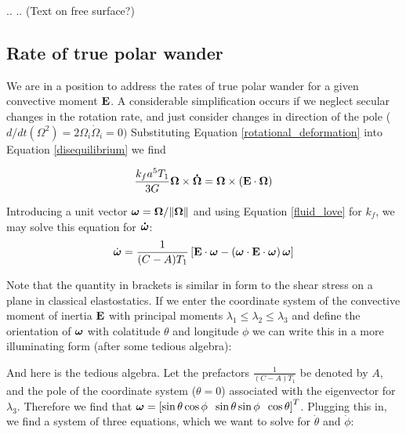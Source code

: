 \documentclass[extra,mreferee]{gji}
\newif\ifdetail
\begin{document}
..
..
(Text on free surface?)

\subsection{Rate of true polar wander}

We are in a position to address the rates of true polar wander for a given convective moment $\bf E$.
A considerable simplification occurs if we neglect secular changes in the rotation rate, and just consider changes in direction of the pole ($d/dt (\Omega^2) = 2 {\Omega_i} \dot{ \Omega}_i = 0)$
Substituting Equation \ref{rotational_deformation} into Equation \ref{disequilibrium} we find

\begin{equation}
\frac{k_f a^5 T_1}{3G}{\bf \Omega} \times {\bf \dot{\Omega} } = {\bf \Omega} \times \left( {\bf E \cdot \Omega} \right)
\label{eq:liouville}
\end{equation}

Introducing a unit vector $\mitbf{\omega} = {\bf \Omega}/\|{\bf \Omega} \|$ and using Equation \ref{fluid_love} for $k_f$,  we may solve this equation for ${\bf \dot{\mitbf{\omega}} }$:
\begin{equation}
 \dot{\mitbf{\omega}}  = \frac{1}{(C-A)T_1} \left[ {\bf E \cdot \mitbf{\omega}} - \left( {\bf \mitbf{\omega} \cdot E \cdot \mitbf{\omega} } \right) \mitbf{\omega} \right]
\end{equation}

Note that the quantity in brackets is similar in form to the shear stress on a plane in classical elastostatics.
If we enter the coordinate system of the convective moment of inertia $\bf E$ with principal moments $\lambda_1 \le \lambda_2 \le \lambda_3$ and define the orientation of $\mitbf{\omega}$ with colatitude $\theta$ and longitude $\phi$ we can write this in a more illuminating form (after some tedious algebra):

\ifdetail

And here is the tedious algebra.  Let the prefactors $\frac{1}{(C-A)T_1}$ be denoted by $A$, and the pole of the coordinate system ($\theta = 0$) associated with the eigenvector for $\lambda_3$.  Therefore we find that $\mitbf{\omega} = \left[ \sin{\theta} \cos{\phi} \;\; \sin{\theta} \sin{\phi} \;\; \cos{\theta} \right]^T$.  Plugging this in, we find a system of three equations, which we want to solve for $\dot{\theta}$ and $\dot{\phi}$:
\end{document}
